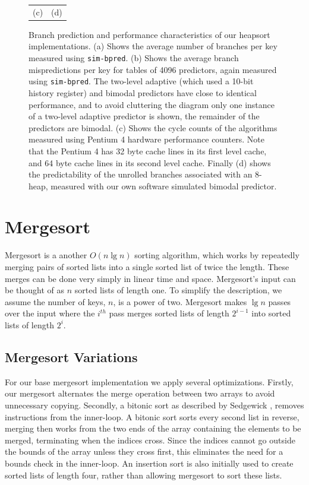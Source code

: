 \documentclass[acmtocl]{acmtrans2m}
\begin{document}
\begin{figure}
\begin{tabular}{cc}
(c) & (d) \\
\end{tabular}
\caption{Branch prediction and performance characteristics of our heapsort
implementations. (a) Shows the average number of branches per key measured using
\texttt{sim-bpred}. (b) Shows the average branch mispredictions per key for
tables of 4096 predictors, again measured using \texttt{sim-bpred}. The
two-level adaptive (which used a 10-bit history register) and bimodal predictors
have close to identical performance, and to avoid cluttering the diagram only
one instance of a two-level adaptive predictor is shown, the remainder of the
predictors are bimodal. (c) Shows the cycle counts of the algorithms measured
using Pentium 4 hardware performance counters. Note that the Pentium 4 has 32
byte cache lines in its first level cache, and 64 byte cache lines in its second
level cache.  Finally (d) shows the predictability of the unrolled branches
associated with an 8-heap, measured with our own software simulated bimodal
predictor.}
\label{heapsort_results}
\end{figure}

\section{Mergesort}
\label{mergesort}

Mergesort \cite{KnuthVol3_98} is a another $O(n \lg n)$ sorting algorithm, which
works by repeatedly merging pairs of sorted lists into a single sorted list of
twice the length. These merges can be done very simply in linear time and space.
Mergesort's input can be thought of as $n$ sorted lists of length one. To
simplify the description, we assume the number of keys, $n$, is a power of two.
Mergesort makes $\lg n$ passes over the input where the $i^{th}$ pass merges
sorted lists of length $2^{i - 1}$ into sorted lists of length $2^i$. 

\subsection{Mergesort Variations}
\label{mergesort_variations}

For our base mergesort implementation we apply several optimizations.  Firstly,
our mergesort alternates the merge operation between two arrays to avoid
unnecessary copying.  Secondly, a bitonic sort as described by Sedgewick
\citeyear{Sedgewick02}, removes instructions from the inner-loop. A bitonic sort
sorts every second list in reverse, merging then works from the two ends of the
array containing the elements to be merged, terminating when the indices cross.
Since the indices cannot go outside the bounds of the array unless they cross
first, this eliminates the need for a bounds check in the inner-loop.  An
insertion sort is also initially used to create sorted lists of length four,
rather than allowing mergesort to sort these lists.
\end{document}
